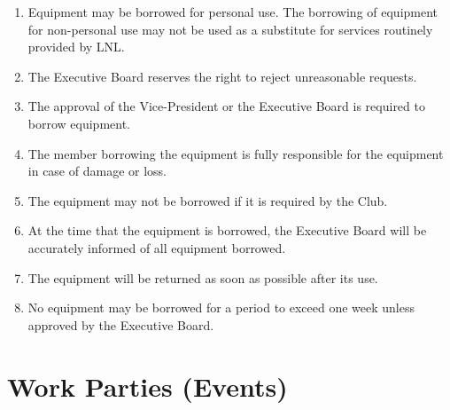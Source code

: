 \documentclass[12pt,letterpaper,oneside]{book}
\begin{document}
\begin{enumerate}

\item Equipment may be borrowed for personal use. The borrowing of equipment for non-personal use may not be used as a substitute for services routinely provided by LNL.
\item The Executive Board reserves the right to reject unreasonable requests.
\item The approval of the Vice-President or the Executive Board is required to borrow equipment.
\item The member borrowing the equipment is fully responsible for the equipment in case of damage or loss.
\item The equipment may not be borrowed if it is required by the Club.
\item At the time that the equipment is borrowed, the Executive Board will be accurately informed of all equipment borrowed.
\item The equipment will be returned as soon as possible after its use.
\item No equipment may be borrowed for a period to exceed one week unless approved by the Executive Board.

\end{enumerate}

\section{Work Parties (Events)}
\end{document}
